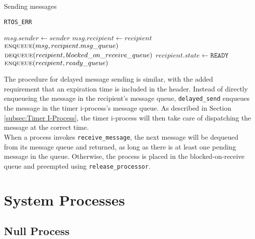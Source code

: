 \documentclass[12pt]{report}
\begin{document}
\begin{algorithm}
\caption{Sending messages}
\begin{algorithmic}[1]
        \State \Return \texttt{RTOS_ERR} 
    \EndIf
            \State {}
        \EndIf
    \EndIf
\EndProcedure

\Statex

    \State $msg.sender \leftarrow sender$
    \State $msg.recipient \leftarrow recipient$
    \State $\Call{enqueue}{msg, recipient.msg\_queue}$
        \State $\Call{dequeue}{recipient, blocked\_on\_receive\_queue}$
        \State $recipient.state \leftarrow \texttt{READY}$
        \State $\Call{enqueue}{recipient, ready\_queue}$
        \State {} 
    \Else
        \State {}
    \EndIf
\EndProcedure
\end{algorithmic}
\end{algorithm}

The procedure for delayed message sending is similar, with the added requirement that an expiration time is included in the header. Instead of directly enqueueing the message in the recipient's message queue, \texttt{delayed_send} enqueues the message in the timer i-process's message queue. As described in Section \ref{subsec:Timer I-Process}, the timer i-process will then take care of dispatching the message at the correct time.\\

When a process invokes \texttt{receive_message}, the next message will be dequeued from its message queue and returned, as long as there is at least one pending message in the queue. Otherwise, the process is placed in the blocked-on-receive queue and preempted using \texttt{release_processor}.

\section{System Processes}

\subsection{Null Process}
\end{document}
